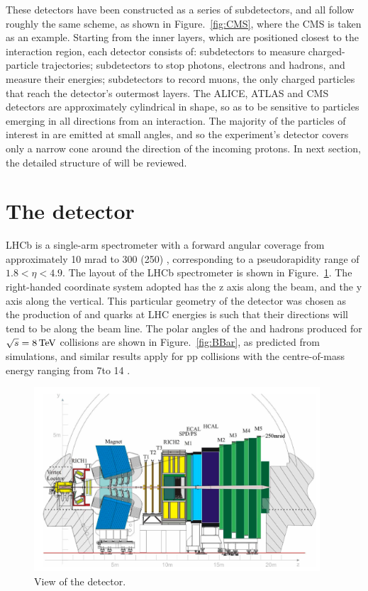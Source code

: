 These detectors have been constructed as a series of subdetectors, 
and all follow roughly the same scheme,
as shown in Figure.~\ref{fig:CMS},
where the CMS is taken as an example. 
Starting from the inner layers, 
which are positioned closest to the interaction region, 
each detector consists of: 
subdetectors to measure charged-particle trajectories; 
subdetectors to stop photons, 
electrons and hadrons, 
and measure their energies; 
subdetectors to record muons, 
the only charged particles that reach the detector’s outermost layers. 
The ALICE, ATLAS and CMS detectors are approximately cylindrical in shape, 
so as to be sensitive to particles emerging in all directions from an interaction. 
The majority of the particles of interest in \lhcb are emitted at small angles, 
and so the experiment’s detector covers only a narrow cone around the direction of the incoming protons.
In next section, 
the detailed structure of \lhcb will be reviewed.


\section{The \lhcb detector}
LHCb is a single-arm spectrometer with a forward angular coverage from approximately 10 mrad to 300 (250) \mrad,
corresponding to a pseudorapidity range of $1.8 <\eta < 4.9$. 
The layout of the LHCb spectrometer is shown in Figure.~\ref{fig:LHCb}. 
The right-handed coordinate system adopted has the z axis along the beam, and the y axis along the vertical.
This particular geometry of the detector was chosen as the production of \bquark and \bquarkbar quarks at LHC energies 
is such that their directions will tend to be along the beam line.
The polar angles of the \bquark and \bquarkbar hadrons produced for $\protect\sqrt{s}=8\text{\,Te\kern -0.1em V}$ collisions are shown in Figure.~\ref{fig:BBar}, 
as predicted from  simulations\supercite{SJOSTRAND2008852},
and similar results apply for pp collisions with the centre-of-mass energy ranging from 7\tev to 14 \tev.

\begin{figure}[!hbtp]
\centering
\includegraphics[width=0.95\textwidth]{Figures/02_Detector/LHCb}%
\caption{View of the \lhcb detector\supercite{LHCb-DP-2008-001}.}
\label{fig:LHCb}
\end{figure}

